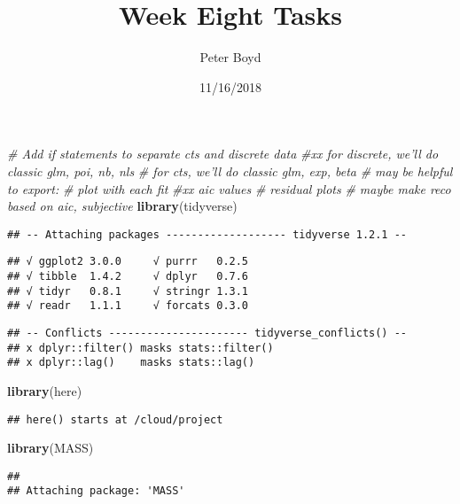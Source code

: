 \documentclass[]{article}
\title{Week Eight Tasks}
\author{Peter Boyd}
\date{11/16/2018}
\newenvironment{Shaded}{\begin{snugshade}}{\end{snugshade}}
\newcommand{\CommentTok}[1]{\textcolor[rgb]{0.56,0.35,0.01}{\textit{#1}}}
\newcommand{\KeywordTok}[1]{\textcolor[rgb]{0.13,0.29,0.53}{\textbf{#1}}}
\newcommand{\NormalTok}[1]{#1}
\begin{document}
\maketitle

\begin{Shaded}
\begin{Highlighting}[]
\CommentTok{# Add if statements to separate cts and discrete data}
\CommentTok{#xx for discrete, we'll do classic glm, poi, nb, nls}
\CommentTok{# for cts, we'll do classic glm, exp, beta}
\CommentTok{# may be helpful to export:}
\CommentTok{#   plot with each fit}
\CommentTok{#xx   aic values}
\CommentTok{#   residual plots}
\CommentTok{#   maybe make reco based on aic, subjective}
\KeywordTok{library}\NormalTok{(tidyverse)}
\end{Highlighting}
\end{Shaded}

\begin{verbatim}
## -- Attaching packages ------------------- tidyverse 1.2.1 --
\end{verbatim}

\begin{verbatim}
## √ ggplot2 3.0.0     √ purrr   0.2.5
## √ tibble  1.4.2     √ dplyr   0.7.6
## √ tidyr   0.8.1     √ stringr 1.3.1
## √ readr   1.1.1     √ forcats 0.3.0
\end{verbatim}

\begin{verbatim}
## -- Conflicts ---------------------- tidyverse_conflicts() --
## x dplyr::filter() masks stats::filter()
## x dplyr::lag()    masks stats::lag()
\end{verbatim}

\begin{Shaded}
\begin{Highlighting}[]
\KeywordTok{library}\NormalTok{(here)}
\end{Highlighting}
\end{Shaded}

\begin{verbatim}
## here() starts at /cloud/project
\end{verbatim}

\begin{Shaded}
\begin{Highlighting}[]
\KeywordTok{library}\NormalTok{(MASS)}
\end{Highlighting}
\end{Shaded}

\begin{verbatim}
## 
## Attaching package: 'MASS'
\end{verbatim}
\end{document}
